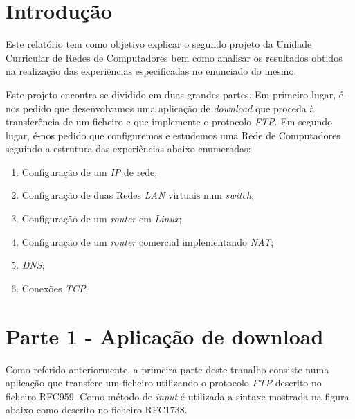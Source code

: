 \documentclass[a4paper]{article}
\begin{document}
	\maketitle
	\thispagestyle{empty}

	\newpage

	\section{Introdução}
	\normalsize

Este relatório tem como objetivo explicar o segundo projeto da Unidade Curricular de Redes de Computadores bem como analisar os resultados obtidos na realização das experiências especificadas no enunciado do mesmo.

Este projeto encontra-se dividido em duas grandes partes. Em primeiro lugar, é-nos pedido que desenvolvamos uma aplicação de \textit{download} que proceda à transferência de um ficheiro e que implemente o protocolo \textit{FTP}. Em segundo lugar, é-nos pedido que configuremos e estudemos uma Rede de Computadores seguindo a estrutura das experiências abaixo enumeradas:

\begin{enumerate}

\item Configuração de um \textit{IP} de rede;
\item Configuração de duas Redes \textit{LAN} virtuais num \textit{switch};
\item Configuração de um \textit{router} em \textit{Linux};
\item Configuração de um \textit{router} comercial implementando \textit{NAT};
\item \textit{DNS};
\item Conexões \textit{TCP}.

\end{enumerate}

	\newpage

	\tableofcontents	

	\newpage

	\section{Parte 1 - Aplicação de download}

	Como referido anteriormente, a primeira parte deste tranalho consiste numa aplicação que transfere um ficheiro utilizando o protocolo \textit{FTP} descrito no ficheiro RFC959. Como método de \textit{input} é utilizada a sintaxe mostrada na figura abaixo como descrito no ficheiro RFC1738.
\end{document}
